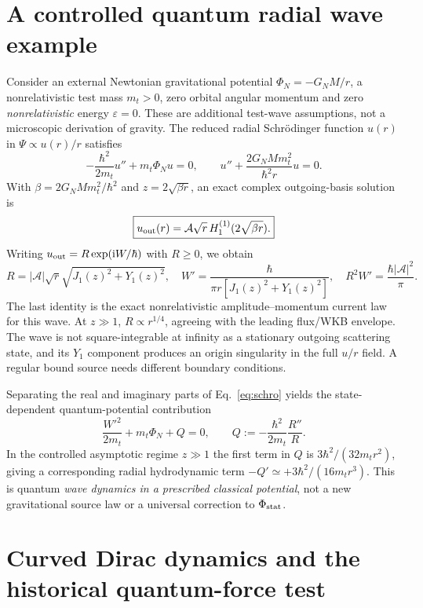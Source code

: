 \documentclass[11pt,a4paper]{article}
\theoremstyle{remark}
\newcommand{\ii}{\mathrm i}
\newcommand{\eref}[1]{Eq.~\eqref{#1}}
\begin{document}
\section{A controlled quantum radial wave example}\label{sec:hankel}
Consider an external Newtonian gravitational potential $\Phi_N=-G_NM/r$, a nonrelativistic test mass $m_t>0$, zero orbital angular momentum and zero \emph{nonrelativistic} energy $\varepsilon=0$. These are additional test-wave assumptions, not a microscopic derivation of gravity. The reduced radial Schr\"odinger function $u(r)$ in $\Psi\propto u(r)/r$ satisfies
\begin{equation}\label{eq:schro}
 -\frac{\hbar^2}{2m_t}u''+m_t\Phi_Nu=0,
 \qquad u''+\frac{2G_NMm_t^2}{\hbar^2r}u=0.
\end{equation}
With $\beta=2G_NMm_t^2/\hbar^2$ and $z=2\sqrt{\beta r}$, an exact complex outgoing-basis solution is
\begin{equation}\label{eq:hankel}
\boxed{u_{\rm out}(r)=\mathcal A\sqrt r\,H_1^{(1)}(2\sqrt{\beta r}).}
\end{equation}
Writing $u_{\rm out}=R\exp(\ii W/\hbar)$ with $R\ge0$, we obtain
\begin{equation}\label{eq:radialphase}
 R=|\mathcal A|\sqrt r\sqrt{J_1(z)^2+Y_1(z)^2},\quad
 W'=\frac{\hbar}{\pi r[J_1(z)^2+Y_1(z)^2]},\quad
 \boxed{R^2W'=\frac{\hbar|\mathcal A|^2}{\pi}.}
\end{equation}
The last identity is the exact nonrelativistic amplitude--momentum current law for this wave. At $z\gg1$, $R\propto r^{1/4}$, agreeing with the leading flux/WKB envelope. The wave is not square-integrable at infinity as a stationary outgoing scattering state, and its $Y_1$ component produces an origin singularity in the full $u/r$ field. A regular bound source needs different boundary conditions.

Separating the real and imaginary parts of \eref{eq:schro} yields the state-dependent quantum-potential contribution
\begin{equation}\label{eq:bohm}
 \frac{W'^2}{2m_t}+m_t\Phi_N+Q=0,
 \qquad Q:=-\frac{\hbar^2}{2m_t}\frac{R''}{R}.
\end{equation}
In the controlled asymptotic regime $z\gg1$ the first term in $Q$ is $3\hbar^2/(32m_tr^2)$, giving a corresponding radial hydrodynamic term $-Q'\simeq+3\hbar^2/(16m_tr^3)$. This is quantum \emph{wave dynamics in a prescribed classical potential}, not a new gravitational source law or a universal correction to $\Phi_{\rm stat}$.

\section{Curved Dirac dynamics and the historical quantum-force test}\label{sec:quantum}
\end{document}

